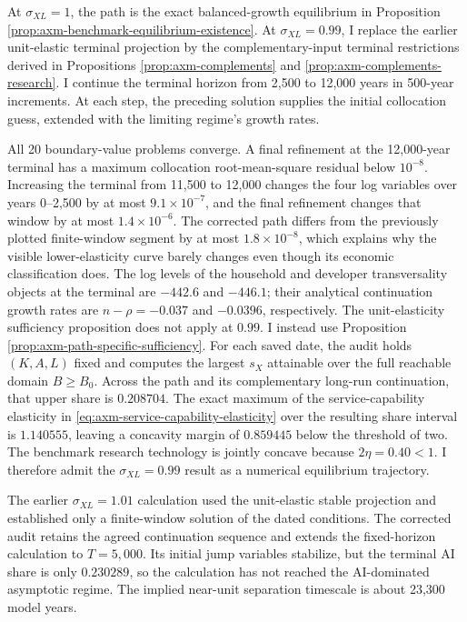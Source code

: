 At \(\sigma_{XL}=1\), the path is the exact balanced-growth equilibrium in
Proposition \ref{prop:axm-benchmark-equilibrium-existence}. At
\(\sigma_{XL}=0.99\), I replace the earlier unit-elastic terminal projection by
the complementary-input terminal restrictions derived in Propositions
\ref{prop:axm-complements} and \ref{prop:axm-complements-research}. I continue
the terminal horizon from 2,500 to 12,000 years in 500-year increments. At each
step, the preceding solution supplies the initial collocation guess, extended
with the limiting regime's growth rates.

All 20 boundary-value problems converge. A final refinement at the 12,000-year
terminal has a maximum collocation root-mean-square residual below \(10^{-8}\).
Increasing
the terminal from 11,500 to 12,000 changes the four log variables over years
0--2,500 by at most \(9.1\times10^{-7}\), and the final refinement changes that
window by at most \(1.4\times10^{-6}\). The corrected path differs from the
previously plotted finite-window segment by at most \(1.8\times10^{-8}\), which
explains why the visible lower-elasticity curve barely changes even though its
economic classification does. The log levels of the household and developer
transversality objects at the terminal are \(-442.6\) and \(-446.1\); their
analytical continuation growth rates are \(n-\rho=-0.037\) and \(-0.0396\), respectively.
The unit-elasticity sufficiency proposition does not apply at \(0.99\). I
instead use Proposition \ref{prop:axm-path-specific-sufficiency}. For each
saved date, the audit holds \((K,A,L)\) fixed and computes the largest
\(s_X\) attainable over the full reachable domain \(B\geq B_0\). Across the
path and its complementary long-run continuation, that upper share is \(0.208704\). The exact
maximum of the service-capability elasticity in
\eqref{eq:axm-service-capability-elasticity} over the resulting share interval
is \(1.140555\), leaving a concavity margin of \(0.859445\) below the threshold
of two. The benchmark research technology is jointly concave because
\(2\eta=0.40<1\). I therefore admit the \(\sigma_{XL}=0.99\) result as a
numerical equilibrium trajectory.

The earlier \(\sigma_{XL}=1.01\) calculation used the unit-elastic stable
projection and established only a finite-window solution of the dated
conditions. The corrected audit retains the agreed continuation sequence and
extends the fixed-horizon calculation to \(T=5{,}000\). Its initial jump
variables stabilize, but the terminal AI share is only \(0.230289\), so the
calculation has not reached the AI-dominated asymptotic regime. The implied
near-unit separation timescale is about 23,300 model years.

